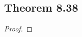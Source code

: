 \documentclass[../../main.tex]{subfiles}
\begin{document}
\subsection{Theorem 8.38}
\begin{wts}

\end{wts}
\begin{proof}

\end{proof}
\end{document}
